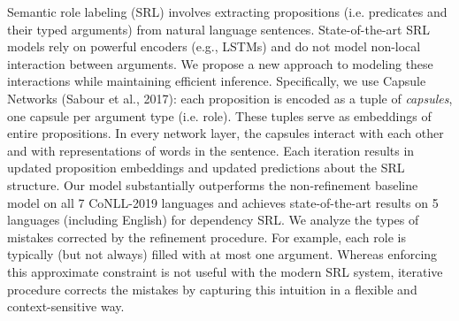 Semantic role labeling (SRL) involves extracting propositions (i.e. predicates and their typed arguments) from natural language sentences. State-of-the-art SRL models rely on powerful encoders (e.g., LSTMs) and do not model non-local interaction between arguments. We propose a new approach to modeling these interactions while maintaining efficient inference. Specifically, we use  Capsule Networks (Sabour et al., 2017): each proposition is encoded as a tuple of  \textit{capsules}, one capsule per argument type (i.e. role). These tuples serve as embeddings of entire propositions.   In every network layer, the capsules interact with each other and with representations of words in the sentence.  Each iteration results in updated proposition embeddings and updated predictions about the SRL structure. Our model substantially outperforms the non-refinement baseline model on all 7 CoNLL-2019 languages and achieves state-of-the-art results on 5 languages (including English) for dependency SRL. We analyze the types of mistakes corrected by the refinement procedure. For example,  each role is typically (but not always) filled with at most one argument. Whereas enforcing this approximate constraint is not useful with the modern SRL system, iterative procedure corrects the mistakes by capturing this intuition in a flexible and context-sensitive way.